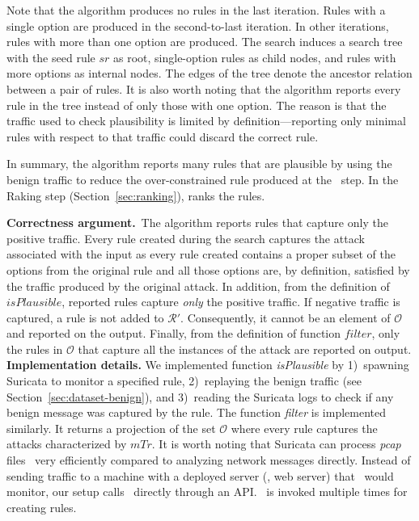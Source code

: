 \documentclass[conference]{IEEEtran}
\begin{document}
Note that the algorithm produces no rules in the last iteration. Rules
with a single option are produced in the second-to-last iteration. In
other iterations, rules with more than one option are produced. The
search induces a search tree with the seed rule $sr$ as root,
single-option rules as child nodes, and rules with more options as
internal nodes. The edges of the tree denote the ancestor relation
between a pair of rules. It is also worth noting that the algorithm
reports every rule in the tree instead of only those with one
option. The reason is that the traffic used to check plausibility is
limited by definition---reporting only minimal rules with respect to
that traffic could discard the correct rule.

In summary, the algorithm reports many rules that are plausible by
using the benign traffic to reduce the over-constrained rule produced
at the \reveng\ step. In the Raking step (Section~\ref{sec:ranking}),
\tname{} ranks the rules.



\textbf{Correctness argument.}~The algorithm reports rules that
capture only the positive traffic. Every rule created during the
search captures the attack associated with the input as every rule
created contains a proper subset of the options from the original rule
and all those options are, by definition, satisfied by the traffic
produced by the original attack. In addition, from the definition of
$\mathit{isPlausible}$, reported rules capture \emph{only} the
positive traffic. If negative traffic is captured, a rule is not added
to $\mathcal R'$. Consequently, it cannot be an element of $\mathcal
O$ and reported on the output. Finally, from the definition of
function $\mathit{filter}$, only the rules in $\mathcal O$ that
capture all the instances of the attack are reported on output.
\textbf{Implementation details.} We implemented function
\emph{isPlausible} by 1)~spawning Suricata to monitor a specified
rule, 2)~replaying the benign traffic (see
Section~\ref{sec:dataset-benign}), and 3)~reading the Suricata logs to
check if any benign message was captured by the rule. The function
\emph{filter} is implemented similarly. It returns a projection of the
set $\mathcal O$ where every rule captures the attacks characterized
by $\mathit{mTr}$. It is worth noting that Suricata can process
\emph{pcap} files~\cite{pcap} very efficiently compared to analyzing
network messages directly. Instead of sending traffic to a machine
with a deployed server (\eg{}, web server) that \suri\ would monitor,
our setup calls \suri\ directly through an API. \suri\ is invoked
multiple times for creating rules.
\end{document}
